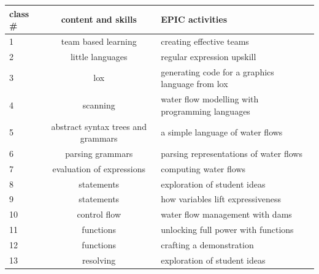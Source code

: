 \documentclass[twoside=false,DIV=14]{scrartcl}
\begin{document}
\begin{tabular}{lcl}
\textbf{class \#} & \textbf{content and skills} & \textbf{EPIC activities} \\
\hline
1 & team based learning  & creating effective teams\\
2 & little languages & regular expression upskill \\
3 & lox & generating code for a graphics language from lox \\
4 & scanning & water flow modelling with programming languages \\
5 & abstract syntax trees and grammars & a simple language of water flows\\
6 & parsing grammars & parsing representations of water flows \\
7 & evaluation of expressions & computing water flows \\
8 & statements & exploration of student ideas \\
9 & statements & how variables lift expressiveness\\
10 & control flow & water flow management with dams \\
11 & functions & unlocking full power with functions \\
12 & functions & crafting a demonstration \\
13 & resolving & exploration of student ideas \\
\hline
\end{tabular}
\end{document}
